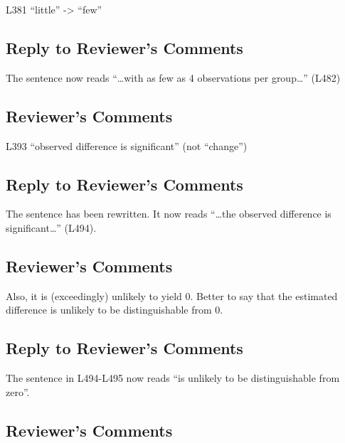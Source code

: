 \documentclass[
]{article}
\begin{document}
L381 ``little'' -\textgreater{} ``few''

\hypertarget{section-34}{%
\subsection{\texorpdfstring{\textcolor{reviewersblue} {Reply to Reviewer's Comments}}{}}\label{section-34}}

The sentence now reads ``\ldots with as few as 4 observations per group\ldots{}'' (L482)

\hypertarget{reviewers-comments-34}{%
\subsection{Reviewer's Comments}\label{reviewers-comments-34}}

L393 ``observed difference is significant'' (not ``change'')

\hypertarget{section-35}{%
\subsection{\texorpdfstring{\textcolor{reviewersblue} {Reply to Reviewer's Comments}}{}}\label{section-35}}

The sentence has been rewritten. It now reads ``\ldots the observed difference is significant\ldots{}'' (L494).

\hypertarget{reviewers-comments-35}{%
\subsection{Reviewer's Comments}\label{reviewers-comments-35}}

Also, it is (exceedingly) unlikely to yield 0. Better to say that the estimated difference is unlikely to be distinguishable from 0.

\hypertarget{section-36}{%
\subsection{\texorpdfstring{\textcolor{reviewersblue} {Reply to Reviewer's Comments}}{}}\label{section-36}}

The sentence in L494-L495 now reads ``is unlikely to be distinguishable from zero''.

\hypertarget{reviewers-comments-36}{%
\subsection{Reviewer's Comments}\label{reviewers-comments-36}}
\end{document}
